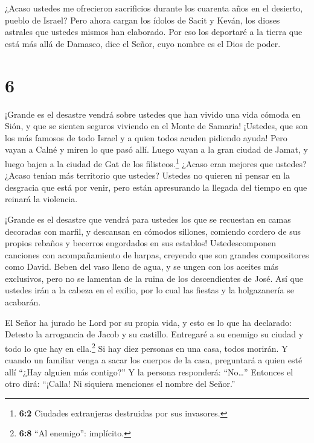  ¿Acaso ustedes me ofrecieron sacrificios durante los
cuarenta años en el desierto, pueblo de Israel?  Pero ahora
cargan los ídolos de Sacit y Keván, los dioses astrales que ustedes
mismos han elaborado.  Por eso los deportaré a la tierra
que está más allá de Damasco, dice el Señor, cuyo nombre es el Dios de
poder.

\hypertarget{section-5}{%
\section{6}\label{section-5}}

 ¡Grande es el desastre vendrá sobre ustedes que han vivido
una vida cómoda en Sión, y que se sienten seguros viviendo en el Monte
de Samaria! ¡Ustedes, que son los más famosos de todo Israel y a quien
todos acuden pidiendo ayuda!  Pero vayan a Calné y miren lo
que pasó allí. Luego vayan a la gran ciudad de Jamat, y luego bajen a la
ciudad de Gat de los filisteos.\footnote{\textbf{6:2} Ciudades
  extranjeras destruidas por sus invasores.} ¿Acaso eran mejores que
ustedes? ¿Acaso tenían más territorio que ustedes?  Ustedes
no quieren ni pensar en la desgracia que está por venir, pero están
apresurando la llegada del tiempo en que reinará la violencia.

 ¡Grande es el desastre que vendrá para ustedes los que se
recuestan en camas decoradas con marfil, y descansan en cómodos
sillones, comiendo cordero de sus propios rebaños y becerros engordados
en sus establos!  Ustedescomponen canciones con
acompañamiento de harpas, creyendo que son grandes compositores como
David.  Beben del vaso lleno de agua, y se ungen con los
aceites más exclusivos, pero no se lamentan de la ruina de los
descendientes de José.  Así que ustedes irán a la cabeza en
el exilio, por lo cual las fiestas y la holgazanería se acabarán.

 El Señor ha jurado he Lord por su propia vida, y esto es lo
que ha declarado: Detesto la arrogancia de Jacob y su castillo.
Entregaré a su enemigo su ciudad y todo lo que hay en ella.\footnote{\textbf{6:8}
  ``Al enemigo'': implícito.}  Si hay diez personas en una
casa, todos morirán.  Y cuando un familiar venga a sacar
los cuerpos de la casa, preguntará a quien esté allí ``¿Hay alguien más
contigo?'' Y la persona responderá: ``No\ldots{}'' Entonces el otro
dirá: ``¡Calla! Ni siquiera menciones el nombre del Señor.''

